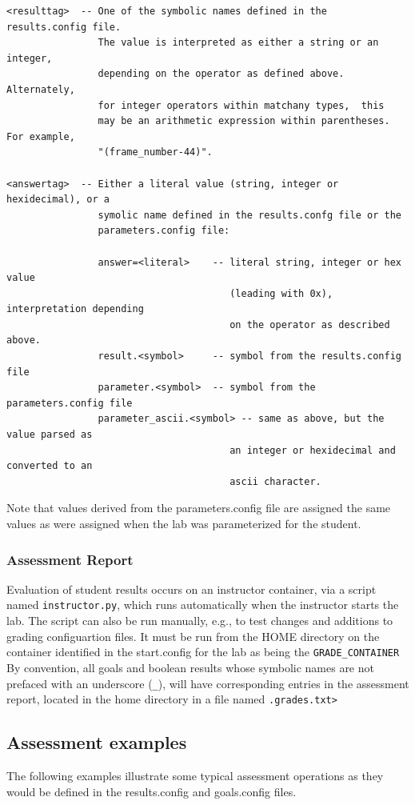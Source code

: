 \documentclass[12pt]{article}
\begin{document}
\begin{verbatim}
<resulttag>  -- One of the symbolic names defined in the results.config file.
                The value is interpreted as either a string or an integer,
                depending on the operator as defined above.  Alternately, 
                for integer operators within matchany types,  this
                may be an arithmetic expression within parentheses.  For example,
                "(frame_number-44)".
                
<answertag>  -- Either a literal value (string, integer or hexidecimal), or a 
                symolic name defined in the results.confg file or the 
                parameters.config file:
 
                answer=<literal>    -- literal string, integer or hex value 
                                       (leading with 0x), interpretation depending 
                                       on the operator as described above.
                result.<symbol>     -- symbol from the results.config file
                parameter.<symbol>  -- symbol from the parameters.config file
                parameter_ascii.<symbol> -- same as above, but the value parsed as 
                                       an integer or hexidecimal and converted to an 
                                       ascii character.

\end{verbatim}
         Note that values derived from the parameters.config file are assigned the same values as
         were assigned when the lab was parameterized for the student.

\subsubsection{Assessment Report}
Evaluation of student results occurs on an instructor container, via a script named {\tt instructor.py}, which runs
automatically when the instructor starts the lab.  The script can also be run manually, e.g., to
test changes and additions to grading configuartion files.  It must be run from the HOME directory
on the container identified in the start.config for the lab as being the {\tt GRADE\_CONTAINER}
By convention, all goals and boolean results whose symbolic names are not prefaced with an
underscore ({\tt\_}), will have corresponding entries in the assessment report, located in 
the home directory in a file named {\tt <lab name>.grades.txt>}


\subsection{Assessment examples}
\label{examples}
The following examples illustrate some typical assessment operations as they would
be defined in the results.config and goals.config files.
\end{document}
